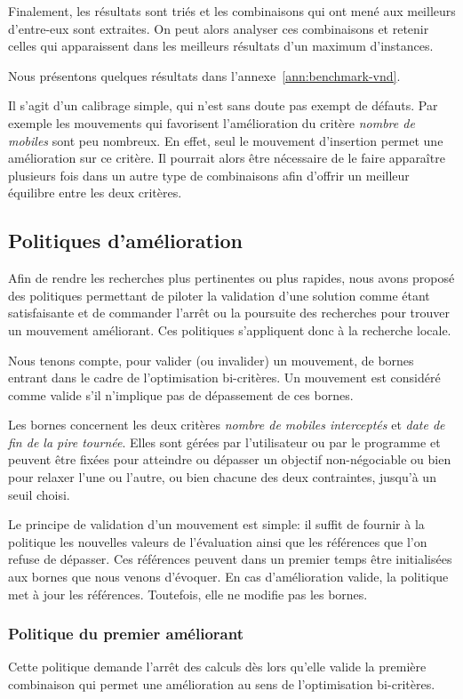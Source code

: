 				Finalement, les résultats sont triés et les combinaisons qui ont mené aux meilleurs d'entre-eux sont extraites. On peut alors analyser ces combinaisons et retenir celles qui apparaissent dans les meilleurs résultats d'un maximum d'instances.

				Nous présentons quelques résultats dans l'annexe~\ref{ann:benchmark-vnd}.

				Il s'agit d'un calibrage simple, qui n'est sans doute pas exempt de défauts. Par exemple les mouvements qui favorisent l'amélioration du critère \emph{nombre de mobiles} sont peu nombreux. En effet, seul le mouvement d'insertion permet une amélioration sur ce critère. Il pourrait alors être nécessaire de le faire apparaître plusieurs fois dans un autre type de combinaisons afin d'offrir un meilleur équilibre entre les deux critères.

		\subsection{Politiques d'amélioration}
			Afin de rendre les recherches plus pertinentes ou plus rapides, nous avons proposé des politiques permettant de piloter la validation d'une solution comme étant satisfaisante et de commander l'arrêt ou la poursuite des recherches pour trouver un mouvement améliorant. Ces politiques s'appliquent donc à la recherche locale.

			Nous tenons compte, pour valider (ou invalider) un mouvement, de bornes entrant dans le cadre de l'optimisation bi-critères. Un mouvement est considéré comme valide s'il n'implique pas de dépassement de ces bornes. 

			Les bornes concernent les deux critères \emph{nombre de mobiles interceptés} et \emph{date de fin de la pire tournée}. Elles sont gérées par l'utilisateur ou par le programme et peuvent être fixées pour atteindre ou dépasser un objectif non-négociable ou bien pour relaxer l'une ou l'autre, ou bien chacune des deux contraintes, jusqu'à un seuil choisi.

			Le principe de validation d'un mouvement est simple: il suffit de fournir à la politique les nouvelles valeurs de l'évaluation ainsi que les références que l'on refuse de dépasser. Ces références peuvent dans un premier temps être initialisées aux bornes que nous venons d'évoquer. En cas d'amélioration valide, la politique met à jour les références. Toutefois, elle ne modifie pas les bornes.

			\subsubsection{Politique du premier améliorant}
				\label{subs:first_available_policy}
				Cette politique demande l'arrêt des calculs dès lors qu'elle valide la première combinaison qui permet une amélioration au sens de l'optimisation bi-critères. 

